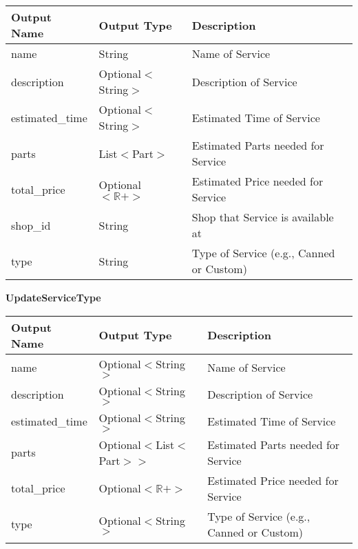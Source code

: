 \documentclass[12pt, titlepage]{article}
\begin{document}
\begin{table}[H]
	\begin{tabular}{|p{}|p{}|p{}|}
		\hline
		\textbf{Output Name} & \textbf{Output Type}    & \textbf{Description}                     \\
		\hline
		name                 & String                  & Name of Service                          \\
		\hline
		description          & Optional$<$String$>$    & Description of Service                   \\
		\hline
		estimated\_time      & Optional$<$String$>$    & Estimated Time of Service                \\
		\hline
		parts                & List$<$Part$>$          & Estimated Parts needed for Service       \\
		\hline
		total\_price         & Optional$<\mathbb{R}+>$ & Estimated Price needed for Service       \\
		\hline
		shop\_id             & String                  & Shop that Service is available at        \\
		\hline
		type                 & String                  & Type of Service (e.g., Canned or Custom) \\
		\hline
	\end{tabular}
\end{table}

\textbf{UpdateServiceType}

\begin{table}[H]
	\begin{tabular}{|p{}|p{}|p{}|}
		\hline
		\textbf{Output Name} & \textbf{Output Type}       & \textbf{Description}                     \\
		\hline
		name                 & Optional$<$String$>$       & Name of Service                          \\
		\hline
		description          & Optional$<$String$>$       & Description of Service                   \\
		\hline
		estimated\_time      & Optional$<$String$>$       & Estimated Time of Service                \\
		\hline
		parts                & Optional$<$List$<$Part$>>$ & Estimated Parts needed for Service       \\
		\hline
		total\_price         & Optional$<\mathbb{R}+>$    & Estimated Price needed for Service       \\
		\hline
		type                 & Optional$<$String$>$       & Type of Service (e.g., Canned or Custom) \\
		\hline
	\end{tabular}
\end{table}
\end{document}
